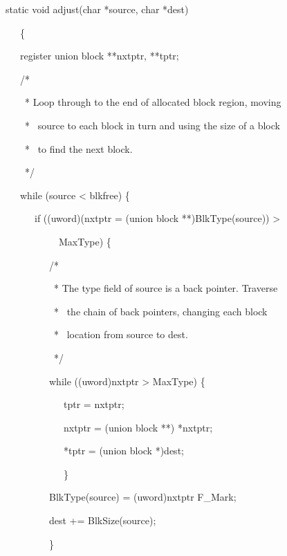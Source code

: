 {\ttfamily\mdseries
static void adjust(char *source, char *dest)
}

{\ttfamily\mdseries
\ \ \ \{
}

{\ttfamily\mdseries
\ \ \ register union block **nxtptr, **tptr;
}

\bigskip

{\ttfamily\mdseries
\ \ \ /*
}

{\ttfamily\mdseries
\ \ \ \ * Loop through to the end of allocated block region, moving}

{\ttfamily\mdseries
\ \ \ \ * \ source to each block in turn and using the size of a block}

{\ttfamily\mdseries
\ \ \ \ * \ to find the next block.
}

{\ttfamily\mdseries
\ \ \ \ */
}

{\ttfamily\mdseries
\ \ \ while (source {\textless} blkfree) \{
}

{\ttfamily\mdseries
\ \ \ \ \ \ if ((uword)(nxtptr = (union block **)BlkType(source)) {\textgreater}}

{\ttfamily\mdseries
\ \ \ \ \ \ \ \ \ \ \ MaxType) \{}


\bigskip

{\ttfamily\mdseries
\ \ \ \ \ \ \ \ \ /*
}

{\ttfamily\mdseries
\ \ \ \ \ \ \ \ \ \ * The type field of source is a back pointer. Traverse}

{\ttfamily\mdseries
\ \ \ \ \ \ \ \ \ \ * \ the chain of back pointers, changing each block}

{\ttfamily\mdseries
\ \ \ \ \ \ \ \ \ \ * \ location from source to dest.
}

{\ttfamily\mdseries
\ \ \ \ \ \ \ \ \ \ */
}

{\ttfamily\mdseries
\ \ \ \ \ \ \ \ \ while ((uword)nxtptr {\textgreater} MaxType) \{
}

{\ttfamily\mdseries
\ \ \ \ \ \ \ \ \ \ \ \ tptr = nxtptr;
}

{\ttfamily\mdseries
\ \ \ \ \ \ \ \ \ \ \ \ nxtptr = (union block **) *nxtptr;
}

{\ttfamily\mdseries
\ \ \ \ \ \ \ \ \ \ \ \ *tptr = (union block *)dest;
}

{\ttfamily\mdseries
\ \ \ \ \ \ \ \ \ \ \ \ \}
}

{\ttfamily\mdseries
\ \ \ \ \ \ \ \ \ BlkType(source) = (uword)nxtptr {\textbar} F\_Mark;
}

{\ttfamily\mdseries
\ \ \ \ \ \ \ \ \ dest += BlkSize(source);
}

{\ttfamily\mdseries
\ \ \ \ \ \ \ \ \ \}
}

